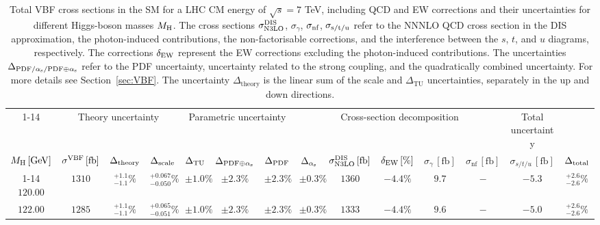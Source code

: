 \begin{landscape}
\begin{table}[ht!]
\caption{Total VBF cross sections in the SM for a LHC CM energy of $\sqrt{s}=7$ TeV, including QCD and EW corrections
and their uncertainties for different Higgs-boson masses \texorpdfstring{$M_\mathrm{H}$}\MH. 
The cross sections $\sigma_{\mathrm{N3LO}}^{\mathrm{DIS}}$, $\sigma_{\gamma}$, $\sigma_{\mbox{\scriptsize nf}}$, $\sigma_{\mbox{\scriptsize s/t/u}}$ refer to the NNNLO QCD cross section in the DIS approximation, the photon-induced contributions, the non-factorisable corrections, and the interference between the $s$, $t$, and $u$ diagrams, respectively.
The corrections $\delta_{\mathrm{EW}}$ represent the EW corrections excluding the photon-induced contributions.
The uncertainties $\Delta_{\mathrm{PDF}/\alpha_{\mathrm{s}}/\mathrm{PDF\oplus\alpha_{\mathrm{s}}}}$ refer to the PDF uncertainty, uncertainty related to the strong coupling, and the quadratically combined uncertainty.
For more details see Section~\ref{sec:VBF}. The uncertainty $\Delta_{\mathrm{theory}}$ is the linear sum of the scale and $\Delta_{\mathrm{TU}}$ uncertainties, separately in the up and down directions.}
\label{tab:vbf_XStot_7}
\centering
\scriptsize
{\renewcommand{\arraystretch}{1.4}
\begin{tabular}{| cc | ccc | ccc | ccc | cc | c |}
\cline{1-14}
\multicolumn{2}{|c|}{\(\sqrt{s} = 7\,\mathrm{TeV}\)} &
\multicolumn{3}{|c|}{Theory uncertainty} &
\multicolumn{3}{|c|}{Parametric uncertainty} &
\multicolumn{5}{|c|}{Cross-section decomposition} &
\multicolumn{1}{c|}{Total uncertainty} \\
\(M_\mathrm{H}\,[\mathrm{GeV}]\) & \(\sigma^{\mathrm{VBF}}\,[\mathrm{fb}]\) &
\(\Delta_{\rm theory}\) &
{\color{black!55}\(\Delta_{\rm scale}\)} & {\color{black!55}\(\Delta_{\rm TU}\)} &
\(\Delta_{\rm PDF\oplus\alpha_{\mathrm{s}}}\) &
{\color{black!55}\(\Delta_{\rm PDF}\)} & {\color{black!55}\(\Delta_{\alpha_{\mathrm{s}}}\)} &
\(\sigma_{\mathrm{N3LO}}^{\mathrm{DIS}}\,[\mathrm{fb}]\) & \(\delta_{\mathrm{EW}}\,[\%]\) & \(\sigma_\gamma\,[\mathrm{fb}]\) & \(\sigma_{\mathrm{nf}}\,[\mathrm{fb}]\) & \(\sigma_{s/t/u}\,[\mathrm{fb}]\) &
\(\Delta_{\rm total}\)
\\
\cline{1-14}
$120.00$ & $1310$ & $^{+1.1}_{-1.1}\%$ & {\color{black!55}$^{+0.067}_{-0.050}\%$} & {\color{black!55}$\pm 1.0\%$} & $\pm 2.3\%$ & {\color{black!55}$\pm 2.3\%$} & {\color{black!55}$\pm 0.3\%$} & $1360$ & $-4.4\%$ & $9.7$ & $-$ & $-5.3$ & $^{+2.6}_{-2.6}\%$ \\
$122.00$ & $1285$ & $^{+1.1}_{-1.1}\%$ & {\color{black!55}$^{+0.065}_{-0.051}\%$} & {\color{black!55}$\pm 1.0\%$} & $\pm 2.3\%$ & {\color{black!55}$\pm 2.3\%$} & {\color{black!55}$\pm 0.3\%$} & $1333$ & $-4.4\%$ & $9.6$ & $-$ & $-5.0$ & $^{+2.6}_{-2.6}\%$ \\

\end{tabular}}
\end{table}
\end{landscape}

